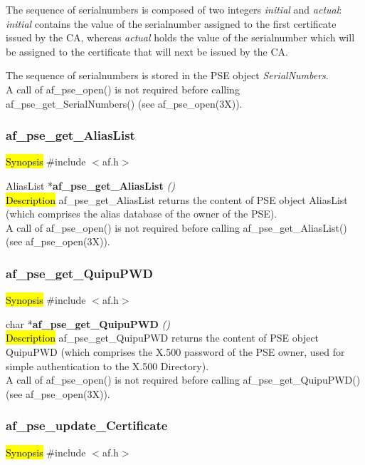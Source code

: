 The sequence of serialnumbers is composed of two integers {\em initial} and {\em actual}:
{\em initial} contains the value of the serialnumber assigned to the first
certificate issued by the CA, whereas {\em actual}
holds the value of the serialnumber which will be assigned to the certificate that will next be issued
by the CA.

The sequence of serialnumbers is stored in the PSE object {\em SerialNumbers}.
\\ [1em]
A call of af\_pse\_open() is not required before calling af\_pse\_get\_SerialNumbers()
(see af\_pse\_open(3X)).


\subsubsection{af\_pse\_get\_AliasList}
\label{af_get_AliasList}
\hl{Synopsis}
\#include $<$af.h$>$

AliasList *{\bf af\_pse\_get\_AliasList} {\em ()} \\
\hl{Description}
af\_pse\_get\_AliasList returns the content of PSE object AliasList (which
comprises the alias database of the owner of the PSE).
\\ [1em]
A call of af\_pse\_open() is not required before calling af\_pse\_get\_AliasList()
(see af\_pse\_open(3X)).


\subsubsection{af\_pse\_get\_QuipuPWD}
\label{af_get_QuipuPWD}
\hl{Synopsis}
\#include $<$af.h$>$

char *{\bf af\_pse\_get\_QuipuPWD} {\em ()} \\
\hl{Description}
af\_pse\_get\_QuipuPWD returns the content of PSE object QuipuPWD (which
comprises the X.500 password of the PSE owner, used for simple authentication to the
X.500 Directory).
\\ [1em]
A call of af\_pse\_open() is not required before calling af\_pse\_get\_QuipuPWD()
(see af\_pse\_open(3X)).


\subsubsection{af\_pse\_update\_Certificate}
\label{af_update_Certificate}
\hl{Synopsis}
\#include $<$af.h$>$

